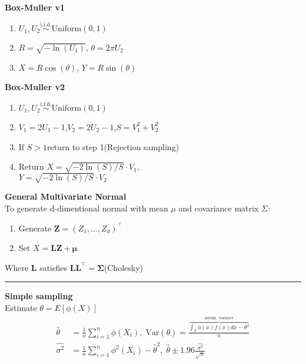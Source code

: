 \documentclass[10pt]{article} %
\begin{document}
\begin{multicols}{4}
{\begin{flushleft}
            \textbf{Box-Muller v1}
            \begin{enumerate}
                \item \(U_1,U_2 \overset{\text{i.i.d.}}{\sim} \text{Uniform}(0,1)\)
                \item \(R = \sqrt{-\ln(U_1)}\), \(\theta = 2\pi U_2\)
                \item \(X = R\cos(\theta)\), \(Y = R\sin(\theta)\)
            \end{enumerate}
            \textbf{Box-Muller v2}
            \begin{enumerate}
                \item \(U_1,U_2 \overset{\text{i.i.d.}}{\sim} \text{Uniform}(0,1)\)
                \item \(V_1 = 2U_1-1\),\(V_2 = 2U_2-1\),\(S=V_1^2+V_2^2\)
                \item If \(S>1\)return to step 1(Rejection sampling)
                \item Return \(X=\sqrt{-2\ln(S)/S} \cdot V_1\), \\
                      \(Y=\sqrt{-2\ln(S)/S} \cdot V_2\)
            \end{enumerate}
            \textbf{General Multivariate Normal}\\
            To generate d-dimentional normal with mean \(\mu\) and covariance matrix
            \(\Sigma\):
            \begin{enumerate}
                \item Generate \(\mathbf{Z} = (Z_1,\dots,Z_d)^{\top}\)
                \item Set \(X=\mathbf{LZ} + \boldsymbol{\mu}\)
            \end{enumerate}
            Where \(\mathbf{L}\) satisfies \(\mathbf{LL^{\top}=\Sigma}\)(Cholesky)
            \hrule
            \vspace{0.1cm}
            \textbf{Simple sampling}\\
            Estimate \(\theta = E[\phi(X)]\)
            {\small
                    \begin{align*}
                        \hat{\theta}   & = \frac{1}{n}\sum_{i=1}^{n}\phi(X_i),\;\text{Var}(\theta) = \frac{\overbrace{\int_{\mathcal{S}}\phi(x)f(x)dx-\theta^2}^{\text{asymp. variance}}}{n} \\
                        \hat{\sigma^2} & = \frac{1}{n} \sum_{i=1}^{n}\phi^2(X_i)-\hat{\theta}^2, \;\hat{\theta} \pm 1.96 \frac{\hat{\sigma^2}}{\sqrt{n}}
                    \end{align*}
}
\end{flushleft}}
\end{multicols}
\end{document}
